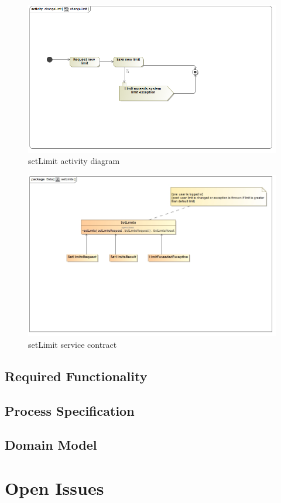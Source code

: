 \documentclass[a4paper,12pt]{article}
\begin{document}
\begin{figure}[H]
  \centering
    \includegraphics[width=1.0\textwidth]{images/changeLimit.png}
    \caption{setLimit activity diagram} 
\end{figure}

\begin{figure}[H]
	\centering
	\includegraphics[width=1.0\textwidth]{images/setLimitsSC.jpg}
	\caption{setLimit service contract}
\end{figure}

\subsection{Required Functionality}

\subsection{Process Specification}
 
\subsection{Domain Model}


\section{Open Issues}
\end{document}
